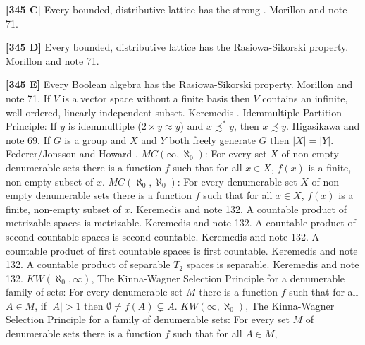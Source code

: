 \smallskip
\item{}{\bf [345 C]}  Every bounded, distributive lattice has the strong
.  \ac{Morillon} \cite{1988} and note 71.
\smallskip
\item{}{\bf [345 D]}  Every bounded, distributive lattice has the
Rasiowa-Sikorski property.  \ac{Morillon} \cite{1988} and note 71.
\smallskip
\item{}{\bf [345 E]}  Every Boolean algebra has the Rasiowa-Sikorski
property.  \ac{Morillon} \cite{1988} and note 71.
\medskip
{}  If $V$ is a vector space without a finite basis
then $V$ contains an infinite, well ordered, linearly independent subset.
Keremedis \cite{2001a}.
\medskip
{} Idemmultiple Partition Principle: If $y$ is
idemmultiple ($2\times y\approx y$) and $x\precsim ^* y$, then
$x\precsim y$. \ac{Higasikawa} \cite{1995} and note 69.
\medskip
{}  If $G$ is a group and $X$ and $Y$ both
freely generate $G$ then $|X| = |Y|$.  \ac{Federer/Jonsson} \cite{1950}
and \ac{Howard} \cite{1985}.
\medskip
{} $MC(\infty,\aleph_0)$: For every set $X$ of
non-empty denumerable sets there is a function $f$ such that for all
$x\in X$, $f(x)$ is a finite, non-empty subset of $x$.
\medskip
{} $MC(\aleph_0,\aleph_0)$: For every denumerable
set $X$ of non-empty denumerable sets there is a function $f$ such that
for all $x\in X$, $f(x)$ is a finite, non-empty subset of $x$.
\ac{Keremedis} \cite{1996b} and note 132.
\medskip
{} A countable product of metrizable spaces
is metrizable. \ac{Keremedis} \cite{1996b} and note 132.
\medskip
{} A countable product of second countable
spaces is second countable. \ac{Keremedis} \cite{1996b} and note 132.
\medskip
{} A countable product of first countable spaces
is first countable. \ac{Keremedis} \cite{1996b} and note 132.
\medskip
{} A countable product of separable $T_2$ spaces
is separable. \ac{Keremedis} \cite{1996b} and note 132.
\medskip
{} $KW(\aleph_0,\infty)$, The Kinna-Wagner Selection
Principle for a denumerable family of sets: For every denumerable set
$M$ there is a function $f$ such that for all $A\in M$, if $|A| > 1$
then $\emptyset\neq f(A)\subsetneq A$.
\medskip
{} $KW(\infty,\aleph_0)$, The Kinna-Wagner Selection
Principle for a family of denumerable sets: For every set $M$ of
denumerable sets there is a function $f$ such that for all $A\in M$,
